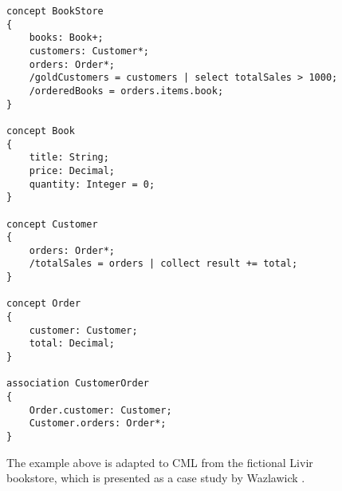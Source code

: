 \begin{figure}
\verbatimfont{\small}
\begin{verbatim}
concept BookStore
{
    books: Book+;
    customers: Customer*;
    orders: Order*;
    /goldCustomers = customers | select totalSales > 1000;
    /orderedBooks = orders.items.book;
}

concept Book
{
    title: String;
    price: Decimal;
    quantity: Integer = 0;
}

concept Customer
{
    orders: Order*;
    /totalSales = orders | collect result += total;
}

concept Order
{
    customer: Customer;
    total: Decimal;
}

association CustomerOrder
{
    Order.customer: Customer;
    Customer.orders: Order*;
}
\end{verbatim}
\caption{The example above is adapted to CML from the fictional Livir bookstore, which is presented as a case study by Wazlawick \cite{wazlawick}.}
\label{fig:store}
\end{figure}
